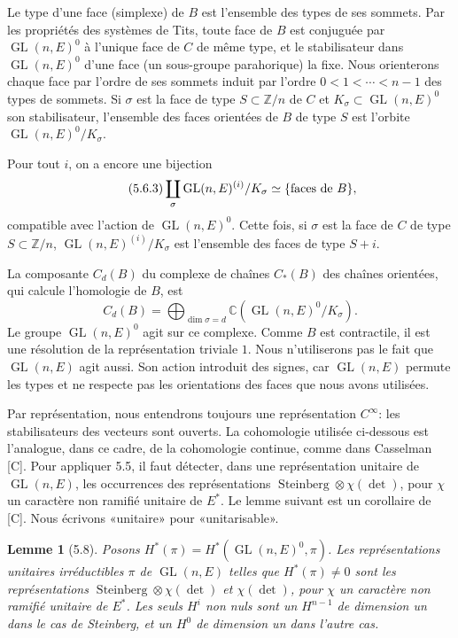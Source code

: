 \documentclass[10pt]{article}
\newcommand{\Z}{\mathbb Z}
\newcommand{\GL}{\operatorname{GL}}
\theoremstyle{deligne}
\newtheorem*{lemma*}{Lemme}
\newcommand{\Stein}{\operatorname{Steinberg}}
\newcommand{\heading}[1]{\vspace{0.7em}\noindent{\bfseries #1}\quad}
\begin{document}
Le type d'une face (simplexe) de $B$ est l'ensemble des types de ses sommets. Par les propriétés des systèmes de Tits, toute face de $B$ est conjuguée par $\GL(n,E)^0$ à l'unique face de $C$ de même type, et le stabilisateur dans $\GL(n,E)^0$ d'une face (un sous-groupe parahorique) la fixe. Nous orienterons chaque face par l'ordre de ses sommets induit par l'ordre $0<1<\cdots<n-1$ des types de sommets. Si $\sigma$ est la face de type $S\subset\Z/n$ de $C$ et $K_\sigma\subset\GL(n,E)^0$ son stabilisateur, l'ensemble des faces orientées de $B$ de type $S$ est l'orbite $\GL(n,E)^0/K_\sigma$.

Pour tout $i$, on a encore une bijection
\begin{equation}\tag{5.6.3}
\coprod_\sigma \GL(n,E)^{(i)}/K_\sigma \simeq \{\hbox{faces de }B\},
\end{equation}
compatible avec l'action de $\GL(n,E)^0$. Cette fois, si $\sigma$ est la face de $C$ de type $S\subset\Z/n$, $\GL(n,E)^{(i)}/K_\sigma$ est l'ensemble des faces de type $S+i$.

La composante $C_d(B)$ du complexe de chaînes $C_*(B)$ des chaînes orientées, qui calcule l'homologie de $B$, est
\begin{equation}\tag{5.6.4}
C_d(B)=\bigoplus_{\dim\sigma=d}\mathbb C(\GL(n,E)^0/K_\sigma).
\end{equation}
Le groupe $\GL(n,E)^0$ agit sur ce complexe. Comme $B$ est contractile, il est une résolution de la représentation triviale $1$. Nous n'utiliserons pas le fait que $\GL(n,E)$ agit aussi. Son action introduit des signes, car $\GL(n,E)$ permute les types et ne respecte pas les orientations des faces que nous avons utilisées.

\heading{5.7.} Par représentation, nous entendrons toujours une représentation $C^\infty$: les stabilisateurs des vecteurs sont ouverts. La cohomologie utilisée ci-dessous est l'analogue, dans ce cadre, de la cohomologie continue, comme dans Casselman [C]. Pour appliquer 5.5, il faut détecter, dans une représentation unitaire de $\GL(n,E)$, les occurrences des représentations $\Stein\otimes\chi(\det)$, pour $\chi$ un caractère non ramifié unitaire de $E^*$. Le lemme suivant est un corollaire de [C]. Nous écrivons «unitaire» pour «unitarisable».

\begin{lemma*}[5.8]
Posons $H^*(\pi)=H^*(\GL(n,E)^0,\pi)$. Les représentations unitaires irréductibles $\pi$ de $\GL(n,E)$ telles que $H^*(\pi)\ne0$ sont les représentations $\Stein\otimes\chi(\det)$ et $\chi(\det)$, pour $\chi$ un caractère non ramifié unitaire de $E^*$. Les seuls $H^i$ non nuls sont un $H^{n-1}$ de dimension un dans le cas de Steinberg, et un $H^0$ de dimension un dans l'autre cas.
\end{lemma*}
\end{document}
